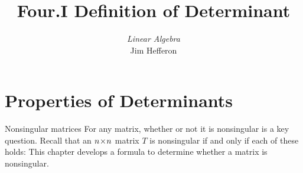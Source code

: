 \usepackage{linalgjh}
\usepackage{present}
\usepackage{directories}  %
\usepackage{xr} %
\usepackage{xr} %
\usepackage{catchfilebetweentags}
\usepackage{etoolbox} %
\makeatletter
\patchcmd{\CatchFBT@Fin@l}{\endlinechar\m@ne}{}
  {}{}
\makeatother

{
}
\hypersetup{colorlinks=true,linkcolor=blue} 

\usepackage{tikz}
\usetikzlibrary{backgrounds}\usetikzlibrary{matrix}

\title[Determinants] %
{Four.I Definition of Determinant}

\author{\textit{Linear Algebra} \\ {\small Jim Hef{}feron}}
\date{}


\subject{Determinants}


\begin{frame}
  \titlepage
\end{frame}




\section{Properties of Determinants}
\begin{frame}{Nonsingular matrices}
\noindent For any matrix, whether or not it is nonsingular is a key question.
Recall that an \( n \! \times \! n \) matrix \( T \) is nonsingular if and only if
each of these holds:%
This chapter develops a formula to determine whether a
matrix is nonsingular.
\end{frame}




